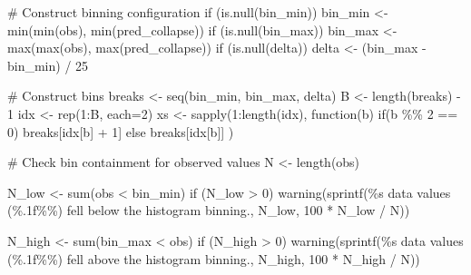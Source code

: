 \documentclass[
  letterpaper,
  DIV=11,
  numbers=noendperiod]{scrartcl}
\newenvironment{Shaded}{\begin{snugshade}}{\end{snugshade}}
\newcommand{\AttributeTok}[1]{\textcolor[rgb]{0.40,0.45,0.13}{#1}}
\newcommand{\CommentTok}[1]{\textcolor[rgb]{0.37,0.37,0.37}{#1}}
\newcommand{\ControlFlowTok}[1]{\textcolor[rgb]{0.00,0.23,0.31}{#1}}
\newcommand{\DecValTok}[1]{\textcolor[rgb]{0.68,0.00,0.00}{#1}}
\newcommand{\FunctionTok}[1]{\textcolor[rgb]{0.28,0.35,0.67}{#1}}
\newcommand{\NormalTok}[1]{\textcolor[rgb]{0.00,0.23,0.31}{#1}}
\newcommand{\OtherTok}[1]{\textcolor[rgb]{0.00,0.23,0.31}{#1}}
\newcommand{\SpecialCharTok}[1]{\textcolor[rgb]{0.37,0.37,0.37}{#1}}
\newcommand{\StringTok}[1]{\textcolor[rgb]{0.13,0.47,0.30}{#1}}
\begin{document}
\begin{Shaded}
\begin{Highlighting}[]
  \CommentTok{\# Construct binning configuration}
  \ControlFlowTok{if}\NormalTok{ (}\FunctionTok{is.null}\NormalTok{(bin\_min))}
\NormalTok{    bin\_min }\OtherTok{\textless{}{-}} \FunctionTok{min}\NormalTok{(}\FunctionTok{min}\NormalTok{(obs), }\FunctionTok{min}\NormalTok{(pred\_collapse))}
  \ControlFlowTok{if}\NormalTok{ (}\FunctionTok{is.null}\NormalTok{(bin\_max))}
\NormalTok{    bin\_max }\OtherTok{\textless{}{-}} \FunctionTok{max}\NormalTok{(}\FunctionTok{max}\NormalTok{(obs), }\FunctionTok{max}\NormalTok{(pred\_collapse))}
  \ControlFlowTok{if}\NormalTok{ (}\FunctionTok{is.null}\NormalTok{(delta))}
\NormalTok{    delta }\OtherTok{\textless{}{-}}\NormalTok{ (bin\_max }\SpecialCharTok{{-}}\NormalTok{ bin\_min) }\SpecialCharTok{/} \DecValTok{25}

  \CommentTok{\# Construct bins}
\NormalTok{  breaks }\OtherTok{\textless{}{-}} \FunctionTok{seq}\NormalTok{(bin\_min, bin\_max, delta)}
\NormalTok{  B }\OtherTok{\textless{}{-}} \FunctionTok{length}\NormalTok{(breaks) }\SpecialCharTok{{-}} \DecValTok{1}
\NormalTok{  idx }\OtherTok{\textless{}{-}} \FunctionTok{rep}\NormalTok{(}\DecValTok{1}\SpecialCharTok{:}\NormalTok{B, }\AttributeTok{each=}\DecValTok{2}\NormalTok{)}
\NormalTok{  xs }\OtherTok{\textless{}{-}} \FunctionTok{sapply}\NormalTok{(}\DecValTok{1}\SpecialCharTok{:}\FunctionTok{length}\NormalTok{(idx),}
               \ControlFlowTok{function}\NormalTok{(b) }\ControlFlowTok{if}\NormalTok{(b }\SpecialCharTok{\%\%} \DecValTok{2} \SpecialCharTok{==} \DecValTok{0}\NormalTok{) breaks[idx[b] }\SpecialCharTok{+} \DecValTok{1}\NormalTok{]}
               \ControlFlowTok{else}\NormalTok{            breaks[idx[b]] )}

  \CommentTok{\# Check bin containment for observed values}
\NormalTok{  N }\OtherTok{\textless{}{-}} \FunctionTok{length}\NormalTok{(obs)}

\NormalTok{  N\_low }\OtherTok{\textless{}{-}} \FunctionTok{sum}\NormalTok{(obs }\SpecialCharTok{\textless{}}\NormalTok{ bin\_min)}
  \ControlFlowTok{if}\NormalTok{ (N\_low }\SpecialCharTok{\textgreater{}} \DecValTok{0}\NormalTok{)}
    \FunctionTok{warning}\NormalTok{(}\FunctionTok{sprintf}\NormalTok{(}\StringTok{\textquotesingle{}\%s data values (\%.1f\%\%) fell below the histogram binning.\textquotesingle{}}\NormalTok{,}
\NormalTok{                    N\_low, }\DecValTok{100} \SpecialCharTok{*}\NormalTok{ N\_low }\SpecialCharTok{/}\NormalTok{ N))}

\NormalTok{  N\_high }\OtherTok{\textless{}{-}} \FunctionTok{sum}\NormalTok{(bin\_max }\SpecialCharTok{\textless{}}\NormalTok{ obs)}
  \ControlFlowTok{if}\NormalTok{ (N\_high }\SpecialCharTok{\textgreater{}} \DecValTok{0}\NormalTok{)}
    \FunctionTok{warning}\NormalTok{(}\FunctionTok{sprintf}\NormalTok{(}\StringTok{\textquotesingle{}\%s data values (\%.1f\%\%) fell above the histogram binning.\textquotesingle{}}\NormalTok{,}
\NormalTok{                    N\_high, }\DecValTok{100} \SpecialCharTok{*}\NormalTok{ N\_high }\SpecialCharTok{/}\NormalTok{ N))}


\end{Highlighting}
\end{Shaded}
\end{document}
